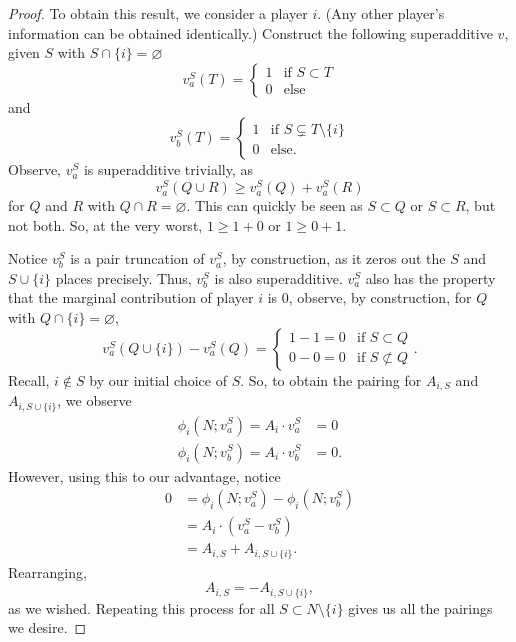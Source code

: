 \documentclass[12pt,letterpaper,final]{article}
\theoremstyle{plain}
\theoremstyle{plain}
\theoremstyle{plain}
\theoremstyle{plain}
\theoremstyle{plain}
\theoremstyle{plain}
\theoremstyle{plain}
\theoremstyle{definition}
\theoremstyle{definition}
\theoremstyle{definition}
\theoremstyle{definition}
\theoremstyle{definition}
\theoremstyle{remark}
\theoremstyle{remark}
\theoremstyle{remark}
\theoremstyle{remark}
\begin{document}
\begin{proof}
   To obtain this result, we consider a player \(i\). (Any other
   player's information can be obtained identically.)
  Construct the following superadditive \(v\), given \(S\) with
  \(S\cap \{i\} = \varnothing\)  
  \[
    v^S_a(T) =
    \begin{cases}
      1 & \text{if } S \subset T\\
      0 & \text{else}
    \end{cases}
  \]
  and
  \[
    v^S_b(T) =
    \begin{cases}
      1 & \text{if } S \subsetneq T\setminus\{i\}\\
      0 & \text{else}.
    \end{cases}
  \]
  Observe, \(v^S_a\) is superadditive trivially, as
  \[
    v^S_a(Q\cup R) \geq v^S_a(Q)+v^S_a(R)
  \]
  for \(Q\) and \(R\) with \(Q\cap R=\varnothing\). This can quickly
  be seen as \(S\subset Q\) or \(S\subset R\), but not both. So,
  at the very worst, \(1\geq 1+0\) or \(1\geq 0+1\).  

  Notice \(v^S_b\) is a pair truncation of \(v^S_a\), by construction, as
  it zeros out the \(S\) and \(S\cup\{i\}\) places precisely.
  Thus, \(v^S_b\)  is also superadditive. \(v^S_a\) also has the property that
  the marginal contribution of player \(i\) is 0, observe, by
  construction, for \(Q\) with \(Q\cap\{i\} = \varnothing\), 
  \[
    v^S_a(Q\cup\{i\}) -v^S_a(Q) =
    \begin{cases}
      1 - 1 = 0 & \text{if } S\subset Q\\
      0-0 = 0 & \text{if } S \not\subset Q
    \end{cases}.
  \]
  Recall, \(i\notin S\) by our initial choice of \(S\). So, to obtain
  the pairing for \(A_{i,S}\) and \(A_{i,S\cup\{i\}}\), we observe
  \begin{align*}
    \phi_i(N;v^S_a) = A_i \cdot v^S_a &= 0\\
    \phi_i(N;v^S_b) = A_i \cdot v^S_b &= 0.
  \end{align*}
  However, using this to our advantage, notice
  \begin{align*}
    0&= \phi_i(N;v^S_a) - \phi_i(N;v^S_b) \\
     &= A_i \cdot (v^S_a-v^S_b)\\
     &= A_{i,S} + A_{i,S\cup\{i\}}.
  \end{align*}
  Rearranging,
  \begin{equation}
    A_{i,S} = -A_{i,S\cup\{i\}},
  \end{equation}
  as we wished. Repeating this process for all
  \(S\subset N\setminus\{i\}\) gives us all the pairings we desire.
\end{proof}
\end{document}

